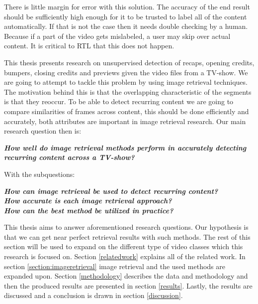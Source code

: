 \documentclass{article}
\begin{document}
There is little margin for error with this solution. The accuracy of the end result should be sufficiently high enough for it to be trusted to label all of the content automatically. If that is not the case then it needs double checking by a human. Because if a part of the video gets mislabeled, a user may skip over actual content. It is critical to RTL that this does not happen.

This thesis presents research on unsupervised detection of recaps, opening credits, bumpers, closing credits and previews given the video files from a TV-show. We are going to attempt to tackle this problem by using image retrieval techniques. The motivation behind this is that the overlapping characteristic of the segments is that they reoccur. To be able to detect recurring content we are going to compare similarities of frames across content, this should be done efficiently and accurately, both attributes are important in image retrieval research. Our main research question then is:
\newline
\begin{adjustwidth}{0.3in}{0.3in}
\textit{\textbf{How well do image retrieval methods perform in accurately detecting recurring content across a TV-show?\newline}}
\end{adjustwidth}
With the subquestions: \\
\begin{adjustwidth}{0.3in}{0.3in}
	\textit{\textbf{How can image retrieval be used to detect recurring content?\newline}}\\
	\textit{\textbf{How accurate is each image retrieval approach?\newline}}\\
	\textit{\textbf{How can the best method be utilized in practice?\newline}}
\end{adjustwidth}
This thesis aims to answer aforementioned research questions. Our hypothesis is that we can get near perfect retrieval results with such methods. The rest of this section will be used to expand on the different type of video classes which this research is focused on. Section \ref{relatedwork} explains all of the related work. In section \ref{section:imageretrieval} image retrieval and the used methods are expanded upon. Section \ref{methodology} describes the data and methodology and then the produced results are presented in section \ref{results}. Lastly, the results are discussed and a conclusion is drawn in section \ref{discussion}.
\end{document}
